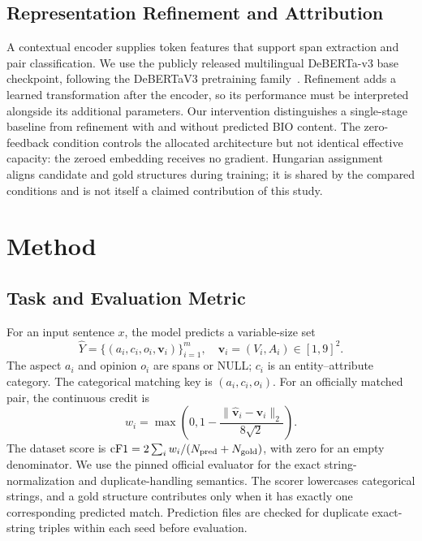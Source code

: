 \documentclass[conference]{IEEEtran}
\begin{document}
\subsection{Representation Refinement and Attribution}
A contextual encoder supplies token features that support span extraction and pair classification. We use the publicly released multilingual DeBERTa-v3 base checkpoint, following the DeBERTaV3 pretraining family~\cite{he2023deberta}. Refinement adds a learned transformation after the encoder, so its performance must be interpreted alongside its additional parameters. Our intervention distinguishes a single-stage baseline from refinement with and without predicted BIO content. The zero-feedback condition controls the allocated architecture but not identical effective capacity: the zeroed embedding receives no gradient. Hungarian assignment~\cite{kuhn1955hungarian} aligns candidate and gold structures during training; it is shared by the compared conditions and is not itself a claimed contribution of this study.

\section{Method}
\subsection{Task and Evaluation Metric}
For an input sentence $x$, the model predicts a variable-size set
\begin{equation}
\widehat{Y}=\{(a_i,c_i,o_i,\mathbf{v}_i)\}_{i=1}^{m},\quad
\mathbf{v}_i=(V_i,A_i)\in[1,9]^2.
\end{equation}
The aspect $a_i$ and opinion $o_i$ are spans or \textsc{NULL}; $c_i$ is an entity--attribute category. The categorical matching key is $(a_i,c_i,o_i)$. For an officially matched pair, the continuous credit is
\begin{equation}
 w_i=\max\left(0,1-\frac{\|\widehat{\mathbf v}_i-\mathbf v_i\|_2}{8\sqrt{2}}\right).
\end{equation}
The dataset score is $\mathrm{cF1}=2\sum_i w_i/(N_{\rm pred}+N_{\rm gold})$, with zero for an empty denominator. We use the pinned official evaluator for the exact string-normalization and duplicate-handling semantics. The scorer lowercases categorical strings, and a gold structure contributes only when it has exactly one corresponding predicted match. Prediction files are checked for duplicate exact-string triples within each seed before evaluation.
\end{document}
